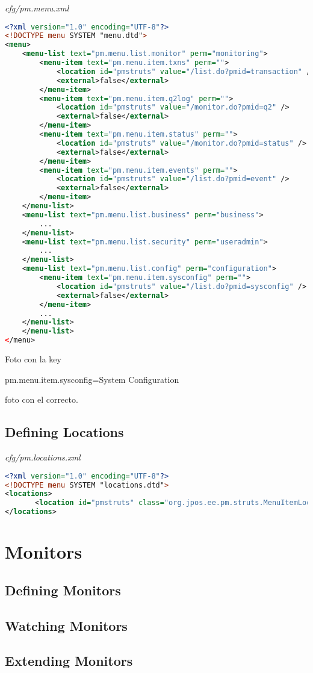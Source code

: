 \emph{cfg/pm.menu.xml}
\begin{lstlisting}[language=XML]
<?xml version="1.0" encoding="UTF-8"?>
<!DOCTYPE menu SYSTEM "menu.dtd">
<menu>
    <menu-list text="pm.menu.list.monitor" perm="monitoring">
        <menu-item text="pm.menu.item.txns" perm="">
            <location id="pmstruts" value="/list.do?pmid=transaction" />
            <external>false</external>
        </menu-item>
        <menu-item text="pm.menu.item.q2log" perm="">
            <location id="pmstruts" value="/monitor.do?pmid=q2" />
            <external>false</external>
        </menu-item> 
        <menu-item text="pm.menu.item.status" perm="">
            <location id="pmstruts" value="/monitor.do?pmid=status" />
            <external>false</external>
        </menu-item> 
        <menu-item text="pm.menu.item.events" perm="">
            <location id="pmstruts" value="/list.do?pmid=event" />
            <external>false</external>
        </menu-item>
    </menu-list>
    <menu-list text="pm.menu.list.business" perm="business">
        ...
    </menu-list>
    <menu-list text="pm.menu.list.security" perm="useradmin">
        ...
    </menu-list>
    <menu-list text="pm.menu.list.config" perm="configuration">
        <menu-item text="pm.menu.item.sysconfig" perm="">
            <location id="pmstruts" value="/list.do?pmid=sysconfig" />
            <external>false</external>
        </menu-item>
        ...
    </menu-list>
    </menu-list>
</menu>
\end{lstlisting}

Foto con la key

pm.menu.item.sysconfig=System Configuration

foto con el correcto.

\subsection{Defining Locations}

\emph{cfg/pm.locations.xml}
\begin{lstlisting}[language=XML]
<?xml version="1.0" encoding="UTF-8"?>
<!DOCTYPE menu SYSTEM "locations.dtd">
<locations>
       <location id="pmstruts" class="org.jpos.ee.pm.struts.MenuItemLocationStruts"/>
</locations>
\end{lstlisting}

\section{Monitors}

\subsection{Defining Monitors}

\subsection{Watching Monitors}

\subsection{Extending Monitors}


